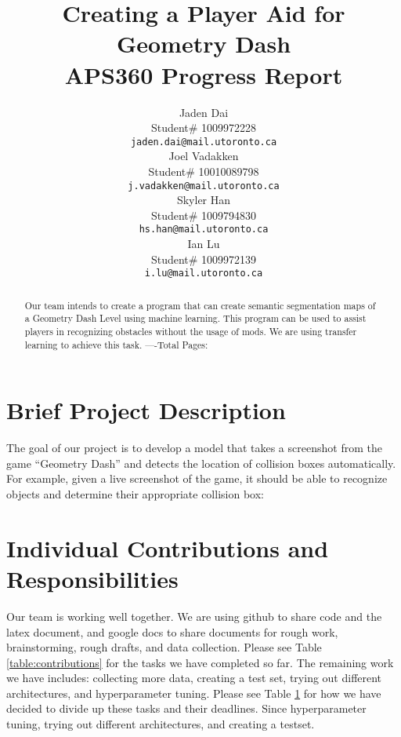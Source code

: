 \documentclass{article} %
\title{Creating a Player Aid for Geometry Dash  \\ 
APS360 Progress Report}
\author{Jaden Dai \\
Student\# 1009972228\\
\texttt{jaden.dai@mail.utoronto.ca} \\
\And
Joel Vadakken  \\
Student\# 10010089798\\
\texttt{j.vadakken@mail.utoronto.ca} \\
\And
Skyler Han  \\
Student\# 1009794830 \\
\texttt{hs.han@mail.utoronto.ca} \\
\AND
Ian Lu  \\
Student\# 1009972139 \\
\texttt{i.lu@mail.utoronto.ca} \\
\AND
}
\begin{document}
\maketitle

\begin{abstract}
Our team intends to create a program that can create semantic segmentation
maps of a Geometry Dash Level using machine learning. This program can be
used to assist players in recognizing obstacles without the usage of mods.
We are using transfer learning to achieve this task.
----Total Pages: \pageref{last_page}
\end{abstract}



\section{Brief Project Description}


The goal of our project is to develop a model that takes a screenshot from the game “Geometry Dash” and detects the location of collision boxes automatically. For example, given a live screenshot of the game, it should be able to recognize objects and determine their appropriate collision box:
 

\section{Individual Contributions and Responsibilities}
\label{gen_inst}

Our team is working well together. We are using github to share code and the latex document, and google docs to share documents for rough work, brainstorming, rough drafts, and data collection. Please see Table \ref{table:contributions} for the tasks we have completed so far. The remaining work we have includes: collecting more data, creating a test set, trying out different architectures, and hyperparameter tuning.  Please see Table \ref{} for how we have decided to divide up these tasks and their deadlines. Since hyperparameter tuning, trying out different architectures, and creating a testset. 
\end{document}
